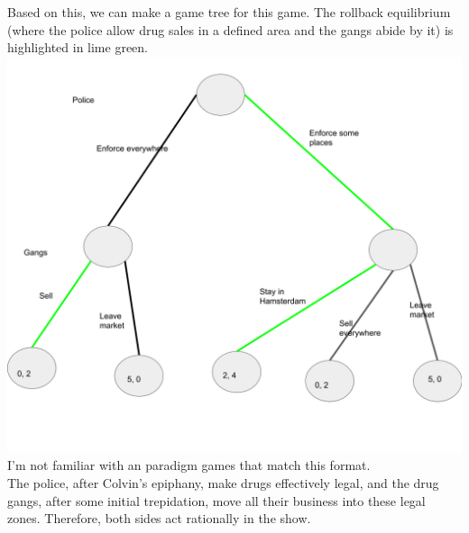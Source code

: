 \documentclass[letterpaper]{article}
\begin{document}
Based on this, we can make a game tree for this game. The rollback equilibrium (where the police allow drug sales in a defined area and the gangs abide by it) is highlighted in lime green. \\
\hspace*{-1.5in}\includegraphics[scale=0.7]{fig1} \\
I'm not familiar with an paradigm games that match this format. \\
The police, after Colvin's epiphany, make drugs effectively legal, and the drug gangs, after some initial trepidation, move all their business into these legal zones. Therefore, both sides act rationally in the show.
\end{document}
